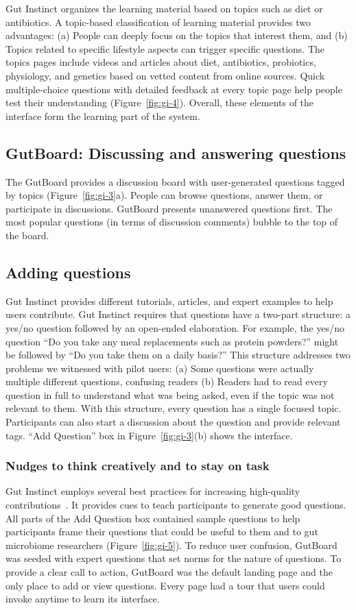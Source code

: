Gut Instinct organizes the learning material based on topics such as diet or antibiotics. A topic-based classification of learning material provides two advantages: (a) People can deeply focus on the topics that interest them, and (b) Topics related to specific lifestyle aspects can trigger specific questions. The topics pages include videos and articles about diet, antibiotics, probiotics, physiology, and genetics based on vetted content from online sources. Quick multiple-choice questions with detailed feedback at every topic page help people test their understanding (Figure~\ref{fig:gi-4}). Overall, these elements of the interface form the learning part of the system. 

\subsection{GutBoard: Discussing and answering questions}
The GutBoard provides a discussion board with user-generated questions tagged by topics (Figure~\ref{fig:gi-3}a). People can browse questions, answer them, or participate in discussions. GutBoard presents unanswered questions first. The most popular questions (in terms of discussion comments) bubble to the top of the board.
 
\subsection{Adding questions}
Gut Instinct provides different tutorials, articles, and expert examples to help users contribute. Gut Instinct requires that questions have a two-part structure: a yes/no question followed by an open-ended elaboration. For example, the yes/no question “Do you take any meal replacements such as protein powders?” might be followed by “Do you take them on a daily basis?” This structure addresses two problems we witnessed with pilot users: (a) Some questions were actually multiple different questions, confusing readers (b) Readers had to read every question in full to understand what was being asked, even if the topic was not relevant to them. With this structure, every question has a single focused topic. Participants can also start a discussion about the question and provide relevant tags. “Add Question” box in Figure~\ref{fig:gi-3}(b) shows the interface.

\subsubsection{Nudges to think creatively and to stay on task}
Gut Instinct employs several best practices for increasing high-quality contributions~\cite{Jennett2014, Resnick2011}. It provides cues to teach participants to generate good questions. All parts of the Add Question box contained sample questions to help participants frame their questions that could be useful to them and to gut microbiome researchers (Figure~\ref{fig:gi-5}). To reduce user confusion, GutBoard was seeded with expert questions that set norms for the nature of questions. To provide a clear call to action, GutBoard was the default landing page and the only place to add or view questions. Every page had a tour that users could invoke anytime to learn its interface.

